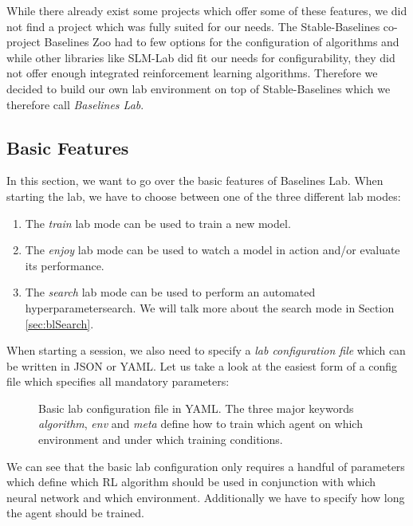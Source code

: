 While there already exist some projects which offer some of these features, we did not find a project which was fully suited for our needs. The Stable-Baselines co-project Baselines Zoo \cite{rl-zoo} had to few options for the configuration of algorithms and while other libraries like SLM-Lab \cite{kenggraesser2017slmlab} did fit our needs for configurability, they did not offer enough integrated reinforcement learning algorithms. Therefore we decided to build our own lab environment on top of Stable-Baselines which we therefore call \textit{Baselines Lab}.

\subsection{Basic Features} \label{sec:blFunctions}
In this section, we want to go over the basic features of Baselines Lab. When starting the lab, we have to choose between one of the three different lab modes:

\begin{enumerate}
    \item The \textit{train} lab mode can be used to train a new model.
    \item The \textit{enjoy} lab mode can be used to watch a model in action and/or evaluate its performance.
    \item The \textit{search} lab mode can be used to perform an automated hyperparametersearch. We will talk more about the search mode in Section \ref{sec:blSearch}.
\end{enumerate}

When starting a session, we also need to specify a \textit{lab configuration file} which can be written in JSON or YAML. Let us take a look at the easiest form of a config file which specifies all mandatory parameters:

\begin{figure}[h]
    
    \caption[Basic lab configuration file]{Basic lab configuration file in YAML. The three major keywords \textit{algorithm}, \textit{env} and \textit{meta} define how to train which agent on which environment and under which training conditions.}
    \label{fig:BasicLabConfig}
\end{figure}


We can see that the basic lab configuration only requires a handful of parameters which define which RL algorithm should be used in conjunction with which neural network and which environment. Additionally we have to specify how long the agent should be trained. 

